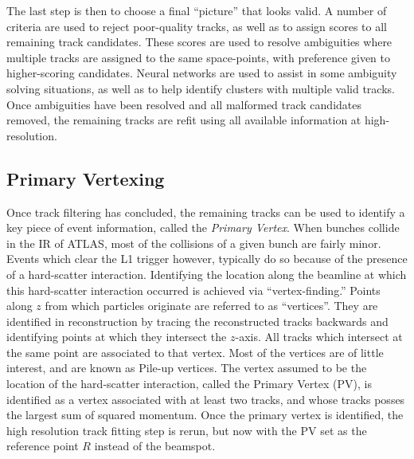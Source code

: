             The last step is then to choose a final ``picture'' that looks valid.
            A number of criteria are used to reject poor-quality tracks, as well as to assign scores to all remaining track candidates.
            These scores are used to resolve ambiguities where multiple tracks are assigned to the same space-points,
                with preference given to higher-scoring candidates.
            Neural networks are used to assist in some ambiguity solving situations,
                as well as to help identify clusters with multiple valid tracks.
            Once ambiguities have been resolved and all malformed track candidates removed,
                the remaining tracks are refit using all available information at high-resolution\cite{atlas_track_reco_performance}.

        \FloatBarrier
        \subsection{Primary Vertexing}

            Once track filtering has concluded,
                the remaining tracks can be used to identify a key piece of event information, 
                called the \textit{Primary Vertex}.
            When bunches collide in the IR of ATLAS, most of the collisions of a given bunch are fairly minor.
            Events which clear the L1 trigger however, typically do so because of the presence of a hard-scatter interaction. %
            Identifying the location along the beamline at which this hard-scatter interaction occurred is achieved via ``vertex-finding.''
            Points along $z$ from which particles originate are referred to as ``vertices''.
            They are identified in reconstruction by tracing the reconstructed tracks backwards
                and identifying points at which they intersect the $z$-axis.
            All tracks which intersect at the same point are associated to that vertex.
            Most of the vertices are of little interest, and are known as Pile-up vertices.
            The vertex assumed to be the location of the hard-scatter interaction, called the Primary Vertex (PV),
                is identified as a vertex associated with at least two tracks,
                and whose tracks posses the largest sum of squared momentum\cite{jet_energy_scale13TeV}.
            Once the primary vertex is identified, the high resolution track fitting step is rerun,
                but now with the PV set as the reference point $R$ instead of the beamspot.


